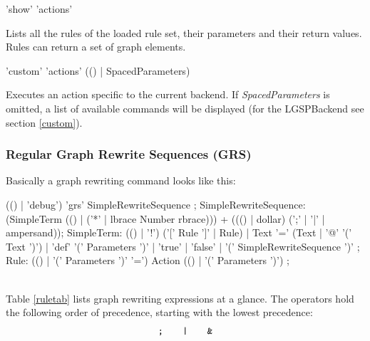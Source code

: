 \documentclass[a4paper,11pt]{report}
\begin{document}
\begin{rail}
  'show' 'actions'
\end{rail}
Lists all the rules of the loaded rule set, their parameters and their return values. Rules can return a set of graph elements.

\begin{rail}
  'custom' 'actions' (() | SpacedParameters)
\end{rail}
Executes an action specific to the current backend. If \emph{SpacedParameters} is omitted, a list of available commands will be displayed (for the LGSPBackend see section \ref{custom}).

\subsubsection{Regular Graph Rewrite Sequences (GRS)}
Basically a graph rewriting command looks like this:
\makeatletter
\begin{rail}
  (() | 'debug') 'grs' SimpleRewriteSequence ;
  SimpleRewriteSequence: (SimpleTerm (() | ('*' | lbrace Number rbrace))) + ((() | dollar) (';' | '|' | ampersand));
  SimpleTerm: (() | '!') ('[' Rule ']' | Rule) |
    Text '=' (Text | '@' '(' Text ')') |
    'def' '(' Parameters ')' |
    'true' |
    'false' |
    '(' SimpleRewriteSequence ')' ;
  Rule: (() | '(' Parameters ')' '=') Action (() | '(' Parameters ')') ;
\end{rail}
\makeatother
\mbox{\quad}\\
Table \ref{ruletab} lists graph rewriting expressions at a glance. The operators hold the following order of precedence, starting with the lowest precedence: 
\[ \text{\texttt{;}} \;\;\;\;\;\;\; \text{\texttt{|}} \;\;\;\;\;\;\;  \text{\texttt{\&}}\] 
\makeatletter
\end{document}
